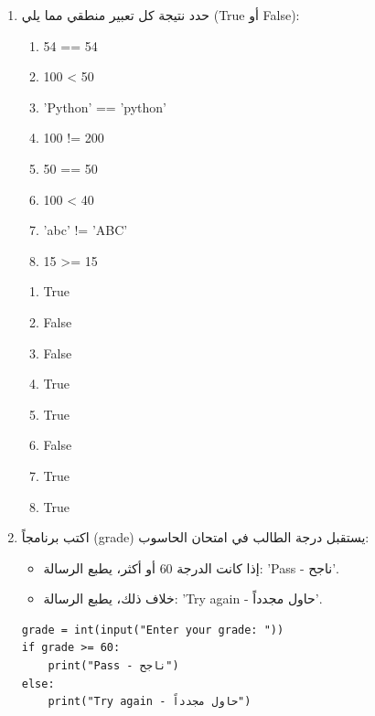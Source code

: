 \documentclass[14pt]{extarticle}
\begin{document}
\begin{enumerate}[itemsep=3em]

\item
حدد نتيجة كل تعبير منطقي مما يلي (\textenglish{True} أو \textenglish{False}):
\begin{enumerate}[label=\arabic*)]
    \item \textenglish{54 == 54}
    \item \textenglish{100 < 50}
    \item \textenglish{'Python' == 'python'}
    \item \textenglish{100 != 200}
    \item \textenglish{50 == 50}
    \item \textenglish{100 < 40}
    \item \textenglish{'abc' != 'ABC'}
    \item \textenglish{15 >= 15}
\end{enumerate}

\ifwithsols
\begin{boxSolution}
\begin{enumerate}[label=\arabic*)]
    \item True
    \item False
    \item False
    \item True
    \item True
    \item False
    \item True
    \item True
\end{enumerate}
\end{boxSolution}
\fi

\item
اكتب برنامجاً (\textenglish{grade}) يستقبل درجة الطالب في امتحان الحاسوب:
\begin{itemize}
    \item إذا كانت الدرجة 60 أو أكثر، يطبع الرسالة: '\textenglish{Pass} - ناجح'.
    \item خلاف ذلك، يطبع الرسالة: '\textenglish{Try again} - حاول مجدداً'.
\end{itemize}

\ifwithsols
\begin{boxSolution}
\begin{english}
\begin{verbatim}
grade = int(input("Enter your grade: "))
if grade >= 60:
    print("Pass - ناجح")
else:
    print("Try again - حاول مجدداً")
\end{verbatim}
\end{english}
\end{boxSolution}
\fi


\end{enumerate}
\end{document}
